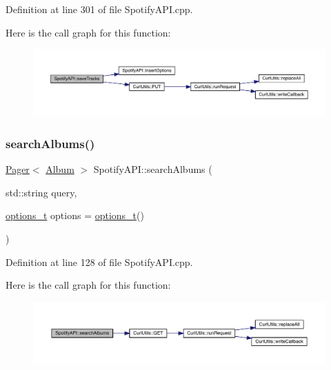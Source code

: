 Definition at line 301 of file Spotify\+A\+P\+I.\+cpp.

Here is the call graph for this function\+:
\nopagebreak
\begin{figure}[H]
\begin{center}
\leavevmode
\includegraphics[width=350pt]{class_spotify_a_p_i_a385e1e97af9b2f8b22ac0538c6f410a1_cgraph}
\end{center}
\end{figure}
\mbox{\label{class_spotify_a_p_i_ad0402c961ecee1c579204eb0d1945261}} 
\subsubsection{\texorpdfstring{search\+Albums()}{searchAlbums()}}
{\footnotesize\ttfamily \mbox{\hyperlink{class_pager}{Pager}}$<$ \mbox{\hyperlink{class_album}{Album}} $>$ Spotify\+A\+P\+I\+::search\+Albums (\begin{DoxyParamCaption}\item[{std\+::string}]{query,  }\item[{\mbox{\hyperlink{_spotify_a_p_i_8h_a0ff5cac1a4007bb330b7d9939650c283}{options\+\_\+t}}}]{options = {\ttfamily \mbox{\hyperlink{_spotify_a_p_i_8h_a0ff5cac1a4007bb330b7d9939650c283}{options\+\_\+t}}()} }\end{DoxyParamCaption})}



Definition at line 128 of file Spotify\+A\+P\+I.\+cpp.

Here is the call graph for this function\+:
\nopagebreak
\begin{figure}[H]
\begin{center}
\leavevmode
\includegraphics[width=350pt]{class_spotify_a_p_i_ad0402c961ecee1c579204eb0d1945261_cgraph}
\end{center}
\end{figure}
\mbox{\label{class_spotify_a_p_i_aae86009494fbfe39fb6c253acaeb5819}} 
